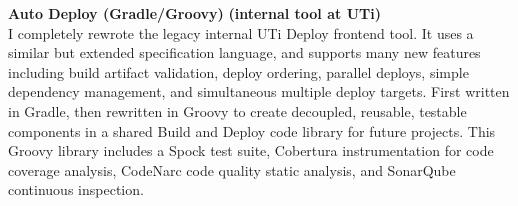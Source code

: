   \item 
  \headerrow 
  {\textbf{Auto Deploy (Gradle/Groovy)}}
  {\textbf{(internal tool at UTi)}}
  \\
  I completely rewrote the legacy internal UTi Deploy frontend tool. It uses a similar but extended specification language, and supports many new features including build artifact validation, deploy ordering, parallel deploys, simple dependency management, and simultaneous multiple deploy targets. First written in Gradle, then rewritten in Groovy to create decoupled, reusable, testable components in a shared Build and Deploy code library for future projects. This Groovy library includes a Spock test suite, Cobertura instrumentation for code coverage analysis, CodeNarc code quality static analysis, and SonarQube continuous inspection.
